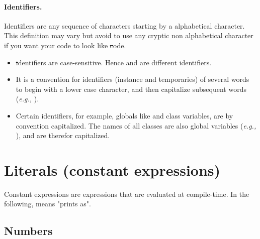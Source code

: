 \documentclass[a4paper,10pt,twoside]{book}
\begin{document}
\paragraph{Identifiers.}
Identifiers are any sequence of characters starting by a alphabetical character.
This definition may vary but avoid to use any cryptic non alphabetical character if you want your code
to look like \st code. 

\begin{itemize}
\item \st identifiers are case-sensitive. Hence  and  are different identifiers. 
\item It is a \st convention for identifiers (instance and temporaries) of several words to begin with a lower case character, and then capitalize subsequent words (\textit{e.g.,} ).
\item  Certain identifiers, for example, globals like  and class variables, are by convention capitalized. The names of all classes are also global variables (\textit{e.g.,} ), and are therefor capitalized.
\end{itemize}


\section{Literals (constant expressions)}


Constant expressions are expressions that are evaluated at compile-time. 
In the following, \ct{-->} means "prints as".

\subsection{Numbers}
\end{document}
